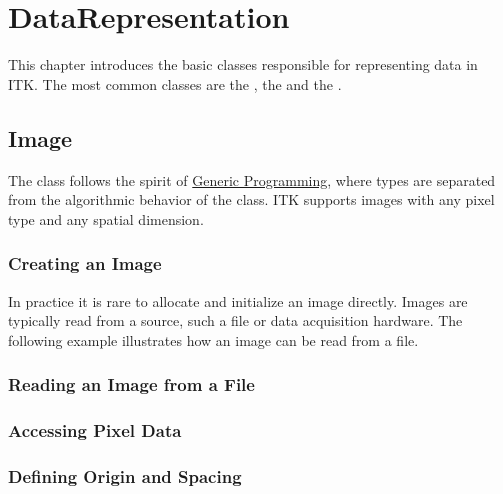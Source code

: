 
\chapter{DataRepresentation}
\label{sec:DataRepresentation}


This chapter introduces the basic classes responsible
for representing data in ITK. The most common classes are the
, the  and the .

\section{Image}
\label{sec:ImageSection}

The  class follows the spirit of 
\href{http://www.boost.org/more/generic_programming.html}{Generic Programming}, 
where types are separated from the algorithmic behavior of the class.  ITK supports images
with any pixel type and any spatial dimension.

\subsection{Creating an Image}\label{sec:CreatingAnImageSection}




In practice it is rare to allocate and initialize an image directly.
Images are typically read from a source, such a file or data acquisition
hardware. The following example illustrates how an image can be read from
a file.




\subsection{Reading an Image from a File}
\label{sec:ReadingImageFromFile}







\subsection{Accessing Pixel Data}
\label{sec:AccessingImagePixelData}






\subsection{Defining Origin and Spacing}
\label{sec:DefiningImageOriginAndSpacing}

